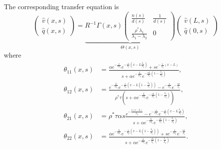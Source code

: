 \documentclass[a4paper, 10pt, conference]{ieeeconf}      %
\begin{document}
The corresponding transfer equation is
{\footnotesize
\begin{equation}
\begin{pmatrix}
	\hat{v}\left(x,s\right)
	\\
	\hat{q}\left(x,s\right)
\end{pmatrix}
=
\underset{\Theta\left(x,s\right)}{
\underbrace{
R^{-1}\Gamma\left(x,s\right)
\begin{pmatrix}
	\frac{n\left(s\right)}{d\left(s\right)}
		&
	\frac{1}{d\left(s\right)}	
	\\
	\frac{\rho^{*}\lambda_{1}}{\lambda_{1} - \lambda_{2}}
		&
	0
\end{pmatrix}
}
}
\begin{pmatrix}
	\hat{v}\left(L,s\right)
	\\
	\hat{q}\left(0,s\right)
\end{pmatrix}
\end{equation}
}
where
{\footnotesize
\begin{subequations}
\begin{align}
\theta_{11}\left(x,s\right) &=
\frac{
	\alpha 
		e^{
			-\frac{x}{\tau\lambda_{1}}
		}
		e^{
			-\frac{s}{\lambda_{1}}
				\left(
					x - L\frac{\lambda_{1}}{\lambda_{2}}
				\right)	
		}
	+
	s 
		e^{-\frac{s}{\lambda_{2}}\left(x - L\right)}
}{
	s
	+
	\alpha
	e^{-\frac{L}{\tau\lambda_{1}}}
	e^{
	-\frac{sL}{\lambda_{1}}
	\left(
		1 - \frac{\lambda_{1}}{\lambda_{2}}
	\right)
	}
}
,\\
\theta_{12}\left(x,s\right) &=
\frac{
	e^{-\frac{L}{\tau\lambda_{1}}}
	e^{-\frac{s}{\lambda_{2}}
		\left(
			x - L
				\left(1 - 
					\frac{\lambda_{2}}{\lambda_{1}}
				\right)
		\right)
	}
	-
	e^{-\frac{x}{\tau\lambda_{1}}}
	e^{-\frac{sx}{\lambda_{1}}}
}
{
	\rho^{*}\tau
	\left(
		s
		+
		\alpha
		e^{-\frac{L}{\tau\lambda_{1}}}
		e^{
			-\frac{sL}{\lambda_{1}}
			\left(
				1 - \frac{\lambda_{1}}{\lambda_{2}}
			\right)
			}
	\right)
},\\
\theta_{21}\left(x,s\right) &=
\rho^{*}\tau\alpha s
\frac{
	e^{-\frac{s\left(x-L\right)}{\lambda_{2}}}
	-
	e^{-\frac{x}{\tau\lambda_{1}}}
	e^{-\frac{s}{\lambda_{1}}
		\left(
			x - L\frac{\lambda_{1}}{\lambda_{2}}
		\right)
	}
}{
	s
	+
	\alpha
	e^{-\frac{L}{\tau\lambda_{1}}}
	e^{
	-\frac{sL}{\lambda_{1}}
	\left(
		1 - \frac{\lambda_{1}}{\lambda_{2}}
	\right)
	}
},\\
\theta_{22}\left(x,s\right) &=
\frac{
	\alpha
	e^{-\frac{L}{\tau\lambda_{1}}}
	e^{-\frac{s}{\lambda_{2}}
		\left(
			x - L
				\left(
				1 - \frac{\lambda_{2}}{\lambda_{1}}
				\right)
		\right)
	}
	+
	s
	e^{-\frac{x}{\tau\lambda_{1}}}
	e^{-\frac{sx}{\lambda_{1}}}
}{
	s
	+
	\alpha
	e^{-\frac{L}{\tau\lambda_{1}}}
	e^{
	-\frac{sL}{\lambda_{1}}
	\left(
		1 - \frac{\lambda_{1}}{\lambda_{2}}
	\right)
	}
}
.
\end{align}
\end{subequations}
}
\end{document}
